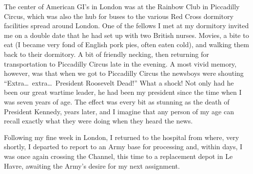 \documentclass[../m3y]{subfiles}
\begin{document}
The center of American GI's in London was at the Rainbow Club in Piccadilly Circus, which was also the hub for buses to the various Red Cross dormitory facilities spread around London. One of the fellows I met at my dormitory invited me on a double date that he had set up with two British nurses. Movies, a bite to eat (I became very fond of English pork pies, often eaten cold), and walking them back to their dormitory. A bit of friendly necking, then returning for transportation to Piccadilly Circus late in the evening. A most vivid memory, however, was that when we got to Piccadilly Circus the newsboys were shouting ``Extra\ldots\ extra\ldots\ President Roosevelt Dead!'' What a shock! Not only had he been our great wartime leader, he had been my president since the time when I was seven years of age. The effect was every bit as stunning as the death of President Kennedy, years later, and I imagine that any person of my age can recall exactly what they were doing when they heard the news.

Following my fine week in London, I returned to the hospital from where, very shortly, I departed to report to an Army base for processing and, within days, I was once again crossing the Channel, this time to a replacement depot in Le Havre, awaiting the Army's desire for my next assignment.
\end{document}
